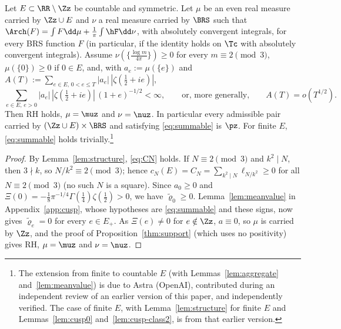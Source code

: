 \begin{theorem}\label{thm:Gfin}
Let $E\subset\RR\setminus\Zz$ be countable and symmetric. Let $\mu$ be an even real measure carried by $\Zz\cup E$ and $\nu$ a real
measure carried by $\BRS$ such that $\Arch(F)=\int F\dd\mu+\frac1\pi\int\hF\dd\nu$, with absolutely convergent integrals, for every BRS
function $F$ (in particular, if the identity holds on $\Tc$ with absolutely convergent integrals). Assume $\nu(\{\frac{\log m}{4\pi}\})\ge0$
for every $m\equiv2\pmod3$, $\mu(\{0\})\ge0$ if $0\in E$, and, with $a_e:=\mu(\{e\})$ and
$A(T):=\sum_{e\in E,\,0<e\le T}|a_e|\,|\zeta(\frac12+ie)|$,
\begin{equation}\label{eq:summable}
\sum_{e\in E,\,e>0}|a_e|\,|\zeta(\tfrac12+ie)|\,(1+e)^{-1/2}<\infty,\qquad\text{or, more generally,}\qquad A(T)=o(T^{1/2}).
\end{equation}
Then RH holds, $\mu=\muz$ and $\nu=\nuz$. In particular every admissible pair carried by $(\Zz\cup E)\times\BRS$ and satisfying
\eqref{eq:summable} is $\pz$. For finite $E$, \eqref{eq:summable} holds trivially.\footnote{The extension from finite to countable $E$ (with Lemmas~\ref{lem:aggregate}
and~\ref{lem:meanvalue}) is due to Astra (OpenAI), contributed during an independent review of an earlier version of this paper, and
independently verified. The case of finite $E$, with Lemma~\ref{lem:structure} for finite $E$ and Lemmas~\ref{lem:cusp0}
and~\ref{lem:cusp-class2}, is from that earlier version.}
\end{theorem}


\begin{proof}
By Lemma~\ref{lem:structure}, \eqref{eq:CN} holds. If $N\equiv2\pmod 3$ and $k^2\mid N$, then $3\nmid k$, so
$N/k^2\equiv2\pmod3$; hence $c_N(E)=C_N=\sum_{k^2\mid N}\ell_{N/k^2}\ge0$ for all $N\equiv2\pmod3$ (no such $N$ is a square). Since
$a_0\ge0$ and $\Xi(0)=-\frac18\pi^{-1/4}\Gamma(\frac14)\zeta(\frac12)>0$, we have $\tilde\varrho_0\ge0$. Lemma~\ref{lem:meanvalue} in
Appendix~\ref{app:cusp}, whose hypotheses are \eqref{eq:summable} and these signs, now gives $\tilde\varrho_e=0$ for every $e\in E_+$. As
$\Xi(e)\ne0$ for $e\notin\Zz$, $a\equiv0$, so $\mu$ is carried by $\Zz$, and the proof of Proposition~\ref{thm:support} (which uses no
positivity) gives RH, $\mu=\muz$ and $\nu=\nuz$.
\end{proof}

